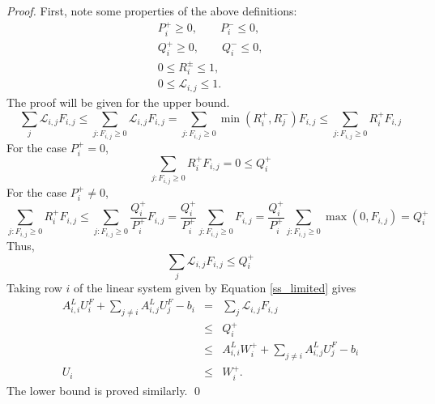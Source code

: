\begin{proof}
   First, note some properties of the above definitions:
   \begin{gather*}
      P_i^+ \geq 0, \qquad P_i^- \leq 0,\\
      Q_i^+ \geq 0, \qquad Q_i^- \leq 0,\\
      0 \leq R_i^\pm \leq 1,\\
      0 \leq \mathcal{L}_{i,j} \leq 1.
   \end{gather*}
   The proof will be given for the upper bound.
   \[
      \sum\limits_j \mathcal{L}_{i,j}F_{i,j}
         \leq \sum\limits_{j:F_{i,j}\geq 0} \mathcal{L}_{i,j}F_{i,j}
         = \sum\limits_{j:F_{i,j}\geq 0} \min(R_i^+,R_j^-)F_{i,j}
         \leq \sum\limits_{j:F_{i,j}\geq 0} R_i^+ F_{i,j}
   \]
   For the case $P_i^+ = 0$,
   \[
      \sum\limits_{j:F_{i,j}\geq 0} R_i^+ F_{i,j} = 0 \leq Q_i^+
   \]
   For the case $P_i^+ \ne 0$,
   \[
      \sum\limits_{j:F_{i,j}\geq 0} R_i^+ F_{i,j}
      \leq \sum\limits_{j:F_{i,j}\geq 0}\frac{Q_i^+}{P_i^+} F_{i,j}
      = \frac{Q_i^+}{P_i^+} \sum\limits_{j:F_{i,j}\geq 0} F_{i,j}
      = \frac{Q_i^+}{P_i^+} \sum\limits_{j:F_{i,j}\geq 0} \max(0,F_{i,j})
      = Q_i^+
   \]
   Thus,
   \[
      \sum\limits_j \mathcal{L}_{i,j}F_{i,j} \leq Q_i^+
   \]
   Taking row $i$ of the linear system given by Equation \ref{ss_limited} gives
   \begin{eqnarray*}
      A^L_{i,i} U_i^F + \sum\limits_{j\ne i} A_{i,j}^L U_j^F - b_i
         & = & \sum\limits_j \mathcal{L}_{i,j}F_{i,j}\\
         & \leq & Q_i^+\\
         & \leq & A_{i,i}^L W_i^+ + \sum\limits_{j\ne i} A_{i,j}^L U_j^F - b_i\\
      U_i & \leq & W_i^+.
   \end{eqnarray*}
   The lower bound is proved similarly.
   \qed
\end{proof}
